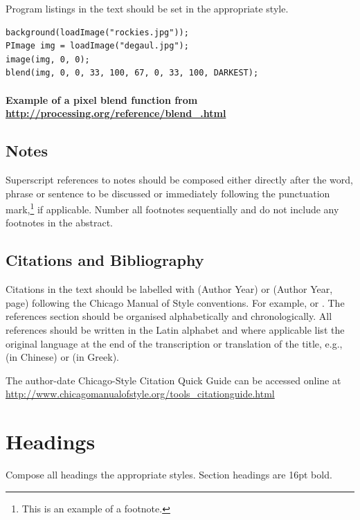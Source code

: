 \documentclass[]{article}
\let\oldparagraph\paragraph
\renewcommand{\paragraph}[1]{\oldparagraph{#1}\mbox{}}
\begin{document}
Program listings in the text should be set in the appropriate style.

\begin{lstlisting}
background(loadImage("rockies.jpg"));
PImage img = loadImage("degaul.jpg");
image(img, 0, 0);
blend(img, 0, 0, 33, 100, 67, 0, 33, 100, DARKEST);
\end{lstlisting}

\paragraph{Example of a pixel blend function from {\url{http://processing.org/reference/blend\_.html}}}

\subsection{Notes}\label{notes}

Superscript references to notes should be composed either directly after the word, phrase or sentence to be discussed or immediately following the punctuation mark,\footnote{This is an example of a footnote.} if applicable. Number all footnotes sequentially and do not include any footnotes in the abstract.

\subsection{Citations and
Bibliography}\label{citations-and-bibliography}

Citations in the text should be labelled with (Author Year) or (Author Year, page) following the Chicago Manual of Style conventions. For example, \cite{Wilson:1998dz} or \cite[27]{auslander2008liveness}. The references section should be organised alphabetically and chronologically. All references should be written in the Latin alphabet and where applicable list the original language at the end of the transcription or translation of the title, e.g., (in Chinese) or (in Greek).

The author-date Chicago-Style Citation Quick Guide can be accessed online at {\url{http://www.chicagomanualofstyle.org/tools\_citationguide.html}}

\section{Headings}\label{headings}

Compose all headings the appropriate styles.  Section headings are 16pt bold.
\end{document}
